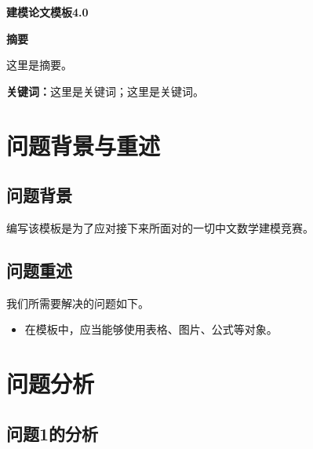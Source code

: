 \documentclass[12pt, a4paper, oneside, utf8]{ctexart}
\begin{document}
    \pagestyle{empty}
    \setcounter{page}{0}

    \begin{center}
        \Large{\textbf{建模论文模板4.0}}
    \end{center}

    \begin{center}
        \Large{\textbf{摘要}}
    \end{center}

    这里是摘要。

    \textbf{关键词：}这里是关键词；这里是关键词。

    \newpage
    \setcounter{page}{1}
    \pagestyle{plain}
    \fancyfoot[C]{\thepage}

    \tableofcontents

    \pagebreak

    \section{问题背景与重述}

    \subsection{问题背景}

    编写该模板是为了应对接下来所面对的一切中文数学建模竞赛。


    \subsection{问题重述}

    我们所需要解决的问题如下。
    \begin{itemize}
        \item 在模板中，应当能够使用表格、图片、公式等对象。
    \end{itemize}

    \section{问题分析}

    \subsection{问题1的分析}
\end{document}
